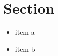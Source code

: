 \section{Section}\label{section}

\begin{itemize}
\tightlist
\item
  item a
\item
  item b
\end{itemize}
